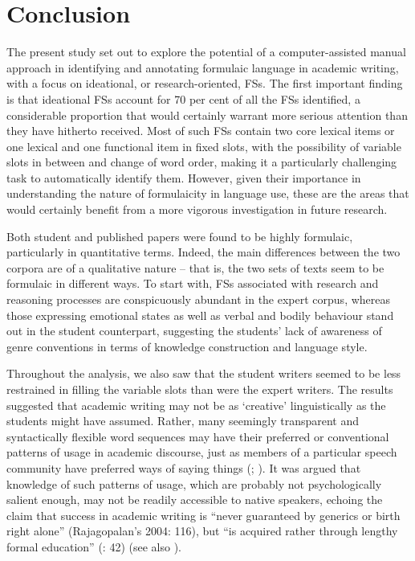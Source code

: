 \section{Conclusion}

The present study set out to explore the potential of a computer-assisted manual approach in identifying and annotating formulaic language in academic writing, with a focus on ideational, or research-oriented, FSs. The first important finding is that ideational FSs account for 70 per cent of all the FSs identified, a considerable proportion that would certainly warrant more serious attention than they have hitherto received. Most of such FSs contain two core lexical items or one lexical and one functional item in fixed slots, with the possibility of variable slots in between and change of word order, making it a particularly challenging task to automatically identify them. However, given their importance in understanding the nature of formulaicity in language use, these are the areas that would certainly benefit from a more vigorous investigation in future research.

Both student and published papers were found to be highly formulaic, particularly in quantitative terms. Indeed, the main differences between the two corpora are of a qualitative nature – that is, the two sets of texts seem to be formulaic in different ways. To start with, FSs associated with research and reasoning processes are conspicuously abundant in the expert corpus, whereas those expressing emotional states as well as verbal and bodily behaviour stand out in the student counterpart, suggesting the students’ lack of awareness of genre conventions in terms of knowledge construction and language style.

Throughout the analysis, we also saw that the student writers seemed to be less restrained in filling the variable slots than were the expert writers. The results suggested that academic writing may not be as ‘creative’ linguistically as the students might have assumed. Rather, many seemingly transparent and syntactically flexible word sequences may have their preferred or conventional patterns of usage in academic discourse, just as members of a particular speech community have preferred ways of saying things (\citealt{Wray2002}; \citealt{Kecskes2016}). It was argued that knowledge of such patterns of usage, which are probably not psychologically salient enough, may not be readily accessible to native speakers, echoing the claim that success in academic writing is “never guaranteed by generics or birth right alone” (Rajagopalan’s 2004: 116), but “is acquired rather through lengthy formal education” (\citealt{FergusonEtAl2011}: 42) (see also \citealt{Hyland2016}). 

